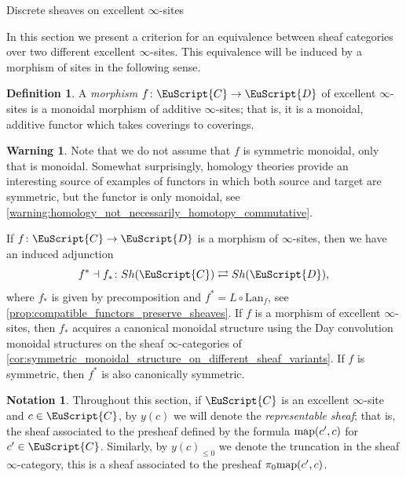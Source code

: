 \documentclass[oneside,a4paper]{amsart}
\makeatletter
\newcommand{\euscr}[1]{\EuScript{#1}} %
\newcommand{\ccat}{\euscr{C}} %
\newcommand{\dcat}{\euscr{D}} %
\newcommand{\map}{\textnormal{map}} %
\theoremstyle{plain}
\theoremstyle{definition}
\newtheorem{warning}[thm]{Warning}
\newtheorem{defin}[thm]{Definition}
\newtheorem{notation}[thm]{Notation}
\theoremstyle{remark}
\def\subsection{\@startsection{subsection}{1}%
  \z@{.7\linespacing\@plus\linespacing}{.5\linespacing}%
  {\normalfont\bfseries\centering}}%
\makeatother
\begin{document}
\subsection{Discrete sheaves on excellent $\infty$-sites}
\label{section:discrete_sheaves_on_excellent_infty_sites}

In this section we present a criterion for an equivalence between sheaf categories over two different excellent $\infty$-sites. This  equivalence will be induced by a morphism of sites in the following sense. 

\begin{defin}
\label{defin:morphism_of_excellent_infty_sites}
A \emph{morphism} $f \colon \ccat \rightarrow \dcat$ of excellent $\infty$-sites is a monoidal morphism of additive $\infty$-sites; that is, it is a monoidal, additive functor which takes coverings to coverings.  
\end{defin} 

\begin{warning}
Note that we do not assume that $f$ is symmetric monoidal, only that is monoidal. Somewhat surprisingly, homology theories provide an interesting source of examples of functors in which both source and target are symmetric, but the functor is only monoidal, see \cref{warning:homology_not_necessarily_homotopy_commutative}.
\end{warning}
If $f \colon \ccat \rightarrow \dcat$ is a morphism of $\infty$-sites, then we have an induced adjunction 
\[
f^{*} \dashv f_{*} \colon Sh(\ccat) \rightleftarrows Sh(\dcat),
\]
where $f_{*}$ is given by precomposition and $f^{*} = L \circ \mathrm{Lan}_{f}$, see \cref{prop:compatible_functors_preserve_sheaves}. If $f$ is  a morphism of excellent $\infty$-sites, then $f_{*}$ acquires a canonical monoidal structure using the Day convolution monoidal structures on the sheaf $\infty$-categories of \cref{cor:symmetric_monoidal_structure_on_different_sheaf_variants}. If $f$ is symmetric, then $f^{*}$ is also canonically symmetric. 

\begin{notation}
Throughout this section, if $\ccat$ is an excellent $\infty$-site and $c \in \ccat$, by $y(c)$ we will denote the \emph{representable sheaf}; that is, the sheaf associated to the presheaf defined by the formula $\map(c^{\prime}, c)$ for $c^\prime \in \ccat$. Similarly, by $y(c)_{\leq 0}$ we denote the truncation in the sheaf $\infty$-category, this is a sheaf associated to the presheaf $\pi_{0} \map(c^\prime, c)$. 
\end{notation}
\end{document}
